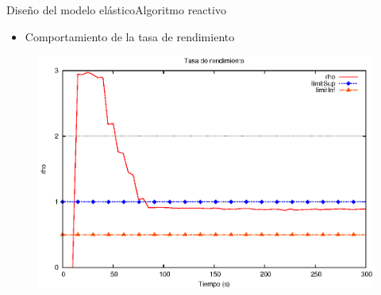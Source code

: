 \begin{frame}{Diseño del modelo elástico}{Algoritmo reactivo}
\begin{itemize}
\item Comportamiento de la tasa de rendimiento
\end{itemize}
\begin{figure}[ht!]
  \centering
    \includegraphics[scale=0.6]{images/Umbrales.eps}
\end{figure}
\end{frame}

